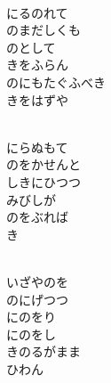 \documentclass[10pt,b5j]{tarticle} %
\begin{document}
\begin{enumerate}
\begin{minipage}[c]{\blocksize}
    \end{minipage}
    \begin{minipage}[c]{\blocksize}
        
        \vspace{\linespace}
        \item~\\
        にるのれて\\
        のまだしくも\\
        のとして\\
        きをふらん\\
        のにもたぐふべき\\
        きをはずや
        
    \end{minipage}
    \begin{minipage}[c]{\blocksize}
        
        \vspace{\linespace}
        \item~\\
        にらぬもて\\
        のをかせんと\\
        しきにひつつ\\
        みびしが\\
        のをぶれば\\
        き
        
    \end{minipage}
    \begin{minipage}[c]{\blocksize}
        
        \vspace{\linespace}
        \item~\\
        いざやのを\\
        のにげつつ\\
        にのをり\\
        にのをし\\
        きのるがまま\\
        ひわん
    
    \end{minipage}
\end{enumerate} %
\end{document}
